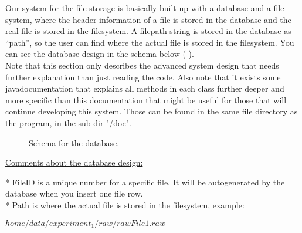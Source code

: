 Our system for the file storage is basically built up with a database and a file system, where the header information of a file is stored in the database and the real file is stored in the filesystem. A filepath string is stored in the database as “path”, so the user can find where the actual file is stored in the filesystem. You can see the database design in the schema below ( ). \\

Note that this section only describes the advanced system design that needs further explanation than just reading the code. Also note that it exists some javadocumentation that explains all methods in each class further deeper and more specific than this documentation that might be useful for those that will continue developing this system. Those can be found in the same file directory as the program, in the sub dir "/doc".

\begin{figure}[htb]
\caption{Schema for the database.}
\label{fig:dat_databaseSchema}
\end{figure}

\underline{Comments about the database design:}

* FileID is a unique number for a specific file. It will be autogenerated by the database when you insert one file row.\\
* Path is where the actual file is stored in the filesystem, example:

\centerline{$home/data/experiment_1/raw/rawFile1.raw$}

